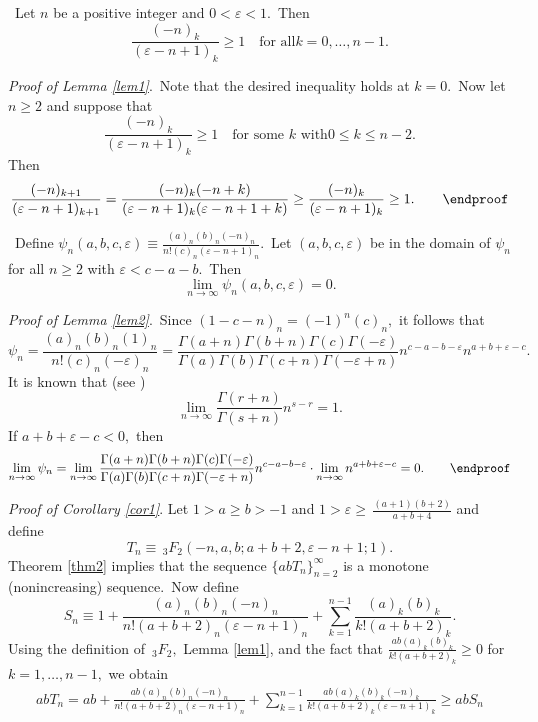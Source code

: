 \documentclass[final,oneeqnum]{siamltex}
\begin{document}
\begin{lemma}\label{lem1}%
\ Let $n$ be a positive integer and $0 <
\varepsilon <1$.\ Then
\[ 
\frac{(-n)_{k}}{(\varepsilon-n+1)_{k}} \geq 1 \quad \mbox{for all
$k=0,\dots, n-1$.}
\]
\end{lemma}

{\it Proof of Lemma {\rm\ref{lem1}}}.\ Note that the desired inequality holds at
$k=0$.\ Now
 let $n \geq 2$ and  suppose that
\[ 
\frac{(-n)_{k}}{(\varepsilon-n+1)_{k}} \geq 1 \quad \mbox{for some $k$ with
$0\le k\leq n-2$.}\]
 Then
\[
\frac{(-n)_{k+1}}{(\varepsilon-n+1)_{k+1}}=\frac{(-n)_{k}(-n+k)}{(\varepsilon-
n+1)_{k}(\varepsilon-n+1+k)}\geq
\frac{(-n)_{k}}{(\varepsilon-n+1)_{k}} \geq 1.
\qquad\endproof\]%

\begin{lemma}
\label{lem2}%
\ Define
$\psi_{n}(a,b,c,\varepsilon)\equiv
\frac{(a)_{n}(b)_{n}(-n)_{n}}{n!(c)_{n}(\varepsilon-n+1)_{n}}$.\ Let
$(a,b,c,\varepsilon)$ be in the  domain of $\psi_{n}$ for all $n \geq 2$
with  $\varepsilon <c-a-b$.\ Then
 \[\lim_{n\rightarrow\infty}\psi_{n}(a,b,c,\varepsilon) = 0.\]
\end{lemma}

{\it Proof of Lemma {\rm\ref{lem2}}}.\ Since $(1-c-n)_{n} = (-1)^{n}(c)_{n},$ it
follows that
\[
\psi_{n} = \frac{(a)_{n}(b)_{n}(1)_{n}}{n!(c)_{n}(-\varepsilon)_{n}} =
\frac{\Gamma(a+n)\Gamma(b+n)\Gamma(c)\Gamma(-\varepsilon)}{\Gamma(a)\Gamma(b
)\Gamma(c+n)\Gamma(-\varepsilon+n)}n^{c-a-b-\varepsilon}n^{a+b+\varepsilon-c}.
\]
It is known that  (see \cite[p. 257, eq.\ (6.1.46)]{A})
\[
\lim_{n\rightarrow\infty} \frac{\Gamma(r+n)}{\Gamma(s+n)}n^{s-r}= 1.
\] 
If
$a+b+\varepsilon -c<0,$ then
\[
\lim_{n\rightarrow\infty} \psi_{n} =
\lim_{n\rightarrow\infty}\frac{\Gamma(a+n)\Gamma(b+n)\Gamma(c)\Gamma(-\varepsilon)}
{\Gamma(a)\Gamma(b)\Gamma(c+n)\Gamma(-\varepsilon+n)}n^{c-a-b-\varepsilon}\cdot
\lim_{n\rightarrow\infty}n^{a+b+\varepsilon-c}=
0.
\qquad\endproof
\]

{\it Proof of Corollary {\rm\ref{cor1}}}.
Let  $1>a\geq b>-1$ and $1>\varepsilon\geq\,\frac{(a+1)(b+2)}{a+b+4}$ and
define
\[
T_{n}\equiv  \,_{3}F_{2}\left(-n,a,b;a+b+2,\varepsilon -n +1;1\right).
\]
Theorem \ref{thm2} implies that the sequence $\{a b T_{n}\}_{n=2}^{\infty}$
is a monotone (nonincreasing) sequence.\ Now define
\[S_{n} \equiv    1+
\frac{(a)_{n}(b)_{n}(-n)_{n}}{n!(a+b+2)_{n}(\varepsilon -n +1)_{n}}+
\sum_{k=1}^{n-1}\frac{(a)_{k}(b)_{k}}{k!(a+b+2)_{k}}.\]
 Using the definition of $\,_{3}F_{2},$ Lemma \ref{lem1}, and the fact that
$\displaystyle \frac{a b (a)_{k}(b)_{k}}{k!(a+b+2)_{k}} \geq 0$ for
$k=1,\ldots,n-1,$ we obtain
 \begin{eqnarray} 
a b T_{n} =
 a b + \frac{a b (a)_{n}(b)_{n}(-n)_{n}}{n!(a+b+2)_{n}(\varepsilon -n +1)_{n}}+
\sum_{k=1}^{n-1}\frac{a b
(a)_{k}(b)_{k}(-n)_{k}}{k!(a+b+2)_{k}(\varepsilon -n +1)_{k}}
 \geq a b S_{n}  \nonumber
\end{eqnarray}
\end{document}
